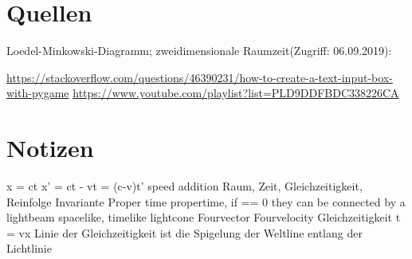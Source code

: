 \documentclass[12pt]{article}
\begin{document}
\section{Quellen}
Loedel-Minkowski-Diagramm; zweidimensionale Raumzeit(Zugriff: 06.09.2019):

\url{https://stackoverflow.com/questions/46390231/how-to-create-a-text-input-box-with-pygame}
\url{https://www.youtube.com/playlist?list=PLD9DDFBDC338226CA}
\section{Notizen}

x = ct
x' = ct - vt = (c-v)t'
speed addition
Raum, Zeit, Gleichzeitigkeit, Reinfolge
Invariante Proper time
propertime, if == 0 they can be connected by a lightbeam
spacelike, timelike
lightcone
Fourvector
Fourvelocity
Gleichzeitigkeit t = vx
Linie der Gleichzeitigkeit ist die Spigelung der Weltline entlang der Lichtlinie
\end{document}
